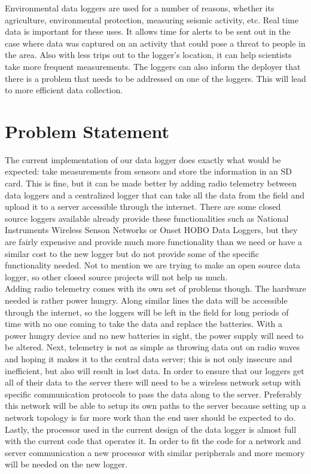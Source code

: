 \documentclass[12pt]{article}
\begin{document}
Environmental data loggers are used for a number of reasons, whether its agriculture, environmental protection, measuring seismic activity, etc. Real time data is important for these uses. It allows time for alerts to be sent out in the case where data was captured on an activity that could pose a threat to people in the area. Also with less trips out to the logger's location, it can help scientists take more frequent measurements. The loggers can also inform the deployer that there is a problem that needs to be addressed on one of the loggers. This will lead to more efficient data collection.  
\section{Problem Statement}
\label{sec:Problem}
The current implementation of our data logger does exactly what would be expected: take measurements from sensors and store the information in an SD card. This is fine, but it can be made better by adding radio telemetry between data loggers and a centralized logger that can take all the data from the field and upload it to a server accessible through the internet. There are some closed source loggers available already provide these functionalities such as National Instruments Wireless Senson Networks or Onset HOBO Data Loggers, but they are fairly expensive and provide much more functionality than we need or have a similar cost to the new logger but do not provide some of the specific functionality needed. Not to mention we are trying to make an open source data logger, so other closed source projects will not help us much. \\

Adding radio telemetry comes with its own set of problems though. The hardware needed is rather power hungry. Along similar lines the data will be accessible through the internet, so the loggers will be left in the field for long periods of time with no one coming to take the data and replace the batteries. With a power hungry device and no new batteries in sight, the power supply will need to be altered. Next, telemetry is not as simple as throwing data out on radio waves and hoping it makes it to the central data server; this is not only insecure and inefficient, but also will result in lost data. In order to ensure that our loggers get all of their data to the server there will need to be a wireless network setup with specific communication protocols to pass the data along to the server. Preferably this network will be able to setup its own paths to the server because setting up a network topology is far more work than the end user should be expected to do. Lastly, the processor used in the current design of the data logger is almost full with the current code that operates it. In order to fit the code for a network and server communication a new processor with similar peripherals and more memory will be needed on the new logger.
\end{document}

